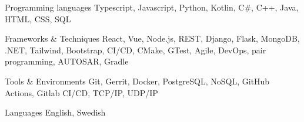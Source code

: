 
\begin{cvskills}

  \cvskill
    {Programming languages} %
    {Typescript, Javascript, Python, Kotlin, C\#, C++, Java, HTML, CSS, SQL} %

  \cvskill
    {Frameworks \& Techniques} %
    {React, Vue, Node.js, REST, Django, Flask, MongoDB, .NET, Tailwind, Bootstrap, CI/CD, CMake, GTest, Agile, DevOps, pair programming, AUTOSAR, Gradle } %

  \cvskill
    {Tools \& Environments} %
    {Git, Gerrit, Docker, PostgreSQL, NoSQL, GitHub Actions, Gitlab CI/CD, TCP/IP, UDP/IP } %

  \cvskill
    {Languages} %
    {English, Swedish} %

\end{cvskills}
